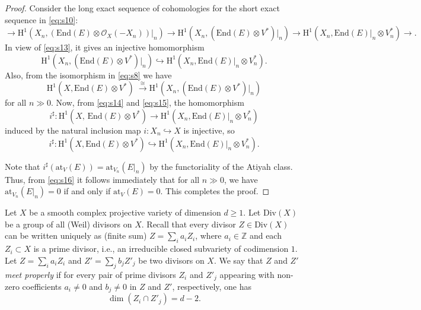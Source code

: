 \documentclass[12pt,reqno]{amsart}
\numberwithin{equation}{section}
\theoremstyle{definition}
\begin{document}
\begin{proof}
Consider the long exact sequence of cohomologies for the short exact sequence in \eqref{eq:s10}:
$$
\longrightarrow  \mathrm{H}^1\left(X_n, \left( \mathrm{End} (E) \otimes
\mathcal{O}_X(-X_n) \right)\big\vert_n \right)
 \longrightarrow  \mathrm{H}^1 (X_n, \left( \mathrm{End} (E)\otimes V^* \right)\big\vert_n) 
\longrightarrow  \mathrm{H}^1 (X_n, \mathrm{End} (E)\big\vert_n \otimes V^*_n)  \longrightarrow .
$$
In view of \eqref{eq:s13}, it gives an injective homomorphism
\begin{equation}
\label{eq:s14}
\mathrm{H}^1 (X_n,  \left( \mathrm{End} (E)\otimes V^* \right)\big\vert_n)  \hookrightarrow 
\mathrm{H}^1 (X_n,  \mathrm{End} (E)\big\vert_n \otimes V^*_n).
\end{equation}
Also, from the isomorphism in \eqref{eq:s8} we have 
\begin{equation}
\label{eq:s15}
\mathrm{H}^1(X, \mathrm{End} (E)\otimes V^*)\ \xrightarrow{\, \cong \,}
\mathrm{H}^1 (X_n, \left( \mathrm{End} (E)\otimes V^* \right)\big\vert_n)
\end{equation}
for all $n  \gg  0$. Now, from \eqref{eq:s14} and \eqref{eq:s15}, the homomorphism 
$$
i^{\sharp}  :  \mathrm{H}^1(X,\, \mathrm{End} (E)\otimes V^*)  \longrightarrow
\mathrm{H}^1 (X_n, \mathrm{End} (E)\big\vert_n \otimes V^*_n)
$$
induced by the natural inclusion map $i  :  X_n  \hookrightarrow  X$ is injective, so
\begin{equation}\label{eq:s16}
i^{\sharp}  :  \mathrm{H}^1(X,  \mathrm{End} (E)\otimes V^*)  \hookrightarrow 
\mathrm{H}^1 (X_n,  \mathrm{End} (E)\big\vert_n \otimes V^*_n).
\end{equation}

Note that $i^{\sharp} (\mathrm{at}_V(E))   =  \mathrm{at}_{V_n}(E\big\vert_n)$ by the functoriality of
the Atiyah class. Thus, from \eqref{eq:s16} it follows immediately that for all $n  \gg  0$, we have $\mathrm{at}_{V_n}(E\big\vert_n)  =   0$ if and only if $\mathrm{at}_V(E)  =  0$.
This completes the proof. 
\end{proof}

Let $X$ be a smooth complex projective variety of dimension $d   \geq  1$. 
Let $\mathrm{Div}(X)$ be a group of all (Weil) divisors on $X$. Recall that every divisor
$Z   \in  \mathrm{Div}(X)$ can be written uniquely as (finite sum) $Z  =  \sum_{i} a_i Z_i$, where
$a_i  \in  \mathbb{Z}$ and each $Z_i  \subset  X$ is a prime divisor, i.e., an irreducible closed subvariety
of codimension $1$. Let $Z  =  \sum_{i} a_i Z_i$ and 
$Z' = \sum_{j} b_j Z'_j$ be two divisors on $X$. We say that $Z$ and $Z'$ \emph{meet properly} if
for every pair of prime divisors $Z_i$ and $Z'_j$ appearing with non-zero coefficients $a_i  \neq  0$
and $b_j  \neq  0 $ in $Z$ and $Z'$, respectively, one has
$$
\dim ( Z_i \cap Z'_j )   =  d - 2 .
$$
\end{document}
